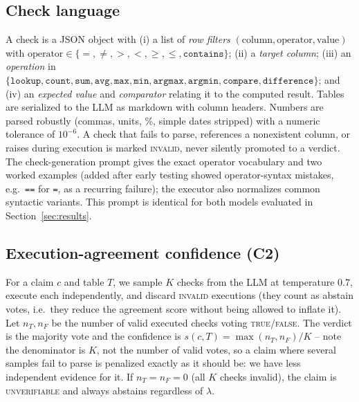 \documentclass[journal]{IEEEtran}
\begin{document}
\subsection{Check language}
A check is a JSON object with (i) a list of \emph{row filters}
$(\text{column}, \text{operator}, \text{value})$ with
$\text{operator}\in\{=,\neq,>,<,\ge,\le,\texttt{contains}\}$; (ii) a
\emph{target column}; (iii) an \emph{operation} in $\{\texttt{lookup},
\texttt{count}, \texttt{sum}, \texttt{avg}, \texttt{max}, \texttt{min},
\texttt{argmax}, \texttt{argmin}, \texttt{compare}, \texttt{difference}\}$;
and (iv) an \emph{expected value} and \emph{comparator} relating it to the
computed result. Tables are serialized to the LLM as markdown with column
headers. Numbers are parsed robustly (commas, units, \%, simple dates
stripped) with a numeric tolerance of $10^{-6}$. A check that fails to parse,
references a nonexistent column, or raises during execution is marked
\textsc{invalid}, never silently promoted to a verdict. The check-generation
prompt gives the exact operator vocabulary and two worked examples (added
after early testing showed operator-syntax mistakes, e.g.\ \texttt{==} for
\texttt{=}, as a recurring failure); the executor also normalizes common
syntactic variants. This prompt is identical for both models evaluated in
Section~\ref{sec:results}.

\subsection{Execution-agreement confidence (C2)}
For a claim $c$ and table $T$, we sample $K$ checks from the LLM at
temperature $0.7$, execute each independently, and discard \textsc{invalid}
executions (they count as abstain votes, i.e.\ they reduce the agreement
score without being allowed to inflate it). Let $n_T,n_F$ be the number of
valid executed checks voting \textsc{true}/\textsc{false}. The verdict is
the majority vote and the confidence is
$s(c,T) = \max(n_T,n_F)/K$ -- note the denominator is $K$, not the number of
valid votes, so a claim where several samples fail to parse is penalized
exactly as it should be: we have less independent evidence for it. If
$n_T=n_F=0$ (all $K$ checks invalid), the claim is \textsc{unverifiable} and
always abstains regardless of $\lambda$.
\end{document}
